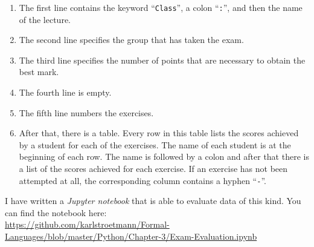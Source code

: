 
\begin{enumerate}
\item The first line contains the keyword ``\texttt{Class}'', a colon ``\texttt{:}'', and then the
      name of the lecture. 
\item The second line specifies the group that has taken the exam.
\item The third line specifies the number of points that are necessary to obtain the best mark.
\item The fourth line is empty.
\item The fifth line numbers the exercises.
\item After that, there is a table.  Every row in this table lists the scores achieved by a student
      for each of the exercises.  The name of each student is at the beginning of each row.  The
      name is followed by a colon and after that there is a list of the scores achieved for each
      exercise.  If an exercise has not been attempted at all, the corresponding column contains a hyphen
      ``\texttt{-}''.
\end{enumerate}
I have written a \textsl{Jupyter notebook} that is able to evaluate data of this kind.
You can find the notebook here:
\\[0.2cm]
\hspace*{0.3cm}
\href{https://github.com/karlstroetmann/Formal-Languages/blob/master/Python/Chapter-3/Exam-Evaluation.ipynb}{https://github.com/karlstroetmann/Formal-Languages/blob/master/Python/Chapter-3/Exam-Evaluation.ipynb}

